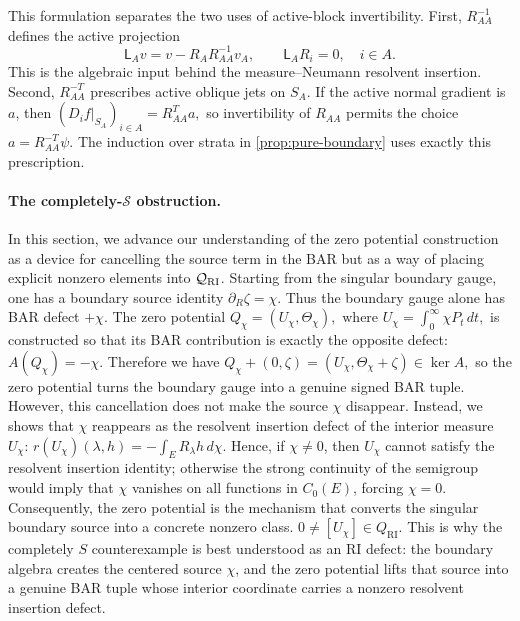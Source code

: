 \documentclass[aihp]{imsart}
\numberwithin{equation}{section}
\theoremstyle{plain}
\theoremstyle{definition}
\newcommand{\1}{\mathbf 1}
\begin{document}
This formulation separates the two uses of active-block invertibility.  First, $R_{AA}^{-1}$ defines the active projection
\[
 \mathsf L_Av=v-R_A R_{AA}^{-1}v_A,
 \qquad
 \mathsf L_A R_i=0,
 \quad i\in A.
\]
This is the algebraic input behind the measure--Neumann resolvent insertion.  Second, $R_{AA}^{-T}$ prescribes active oblique jets on $S_A$.  If the active normal gradient is $a$, then $(D_i f|_{S_A})_{i\in A}=R_{AA}^T a,$ so invertibility of $R_{AA}$ permits the choice $a=R_{AA}^{-T}\psi$.  The induction over strata in \cref{prop:pure-boundary} uses exactly this prescription.

\paragraph{The completely-$\mathcal S$ obstruction.} In this section, we advance our understanding of the zero potential construction as a device for cancelling the source term in the BAR but as a way of placing explicit nonzero elements into $\mathcal Q_{\rm RI}$. Starting from the singular boundary gauge, one has a boundary source identity $\partial_R \zeta = \chi .$ Thus the boundary gauge alone has BAR defect \(+\chi\).  The zero potential $Q_\chi=(U_\chi,\Theta_\chi), \text{ where }
U_\chi=\int_0^\infty \chi P_t\,dt,$ is constructed so that its BAR contribution is exactly the opposite defect: $A(Q_\chi)=-\chi .$ Therefore we have $Q_\chi+(0,\zeta)=(U_\chi,\Theta_\chi+\zeta)\in \ker A,$ so the zero potential turns the boundary gauge into a genuine signed BAR tuple.  However, this cancellation does not make the source \(\chi\) disappear.  Instead, we shows that \(\chi\) reappears as the resolvent insertion defect of the interior measure \(U_\chi\): $r(U_\chi)(\lambda,h)=-\int_E R_\lambda h\,d\chi .$ Hence, if \(\chi\neq 0\), then \(U_\chi\) cannot satisfy the resolvent insertion identity; otherwise the strong continuity of the semigroup would imply that \(\chi\) vanishes on all functions in \(C_0(E)\), forcing \(\chi=0\).  Consequently, the zero potential is the mechanism that converts the singular boundary source into a concrete nonzero class. $0\neq [U_\chi]\in Q_{\mathrm{RI}} .$ This is why the completely \(S\) counterexample is best understood as an RI defect: the boundary algebra creates the centered source \(\chi\), and the zero potential lifts that source into a genuine BAR tuple whose interior coordinate carries a nonzero resolvent insertion defect.
\end{document}
